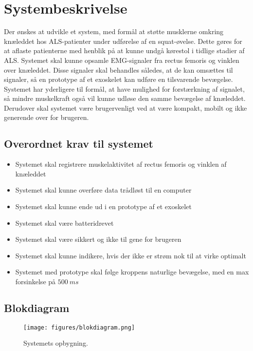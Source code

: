 \section{Systembeskrivelse}
Der ønskes at udvikle et system, med formål at støtte musklerne omkring knæleddet hos ALS-patienter under udførelse af en squat-øvelse. Dette gøres for at aflaste patienterne med henblik på at kunne undgå kørestol i tidlige stadier af ALS. 
Systemet skal kunne opsamle EMG-signaler fra rectus femoris og vinklen over knæleddet. Disse signaler skal behandles således, at de kan omsættes til signaler, så en prototype af et exoskelet kan udføre en tilsvarende bevægelse. 
Systemet har yderligere til formål, at have mulighed for forstærkning af signalet, så mindre muskelkraft også vil kunne udløse den samme bevægelse af knæleddet. 
Derudover skal systemet være brugervenligt ved at være kompakt, mobilt og ikke generende over for brugeren.

\subsection{Overordnet krav til systemet} 
\begin{itemize}
\item Systemet skal registrere muskelaktivitet af rectus femoris og vinklen af knæleddet
\item Systemet skal kunne overføre data trådløst til en computer
\item Systemet skal kunne ende ud i en prototype af et exoskelet
\item Systemet skal være batteridrevet
\item Systemet skal være sikkert og ikke til gene for brugeren 
\item Systemet skal kunne indikere, hvis der ikke er strøm nok til at virke optimalt
\item Systemet med prototype skal følge kroppens naturlige bevægelse, med en max forsinkelse på $500~ms$ 
\end{itemize}


\subsection{Blokdiagram}
\begin{figure}[H]
\centering
\texttt{[image: figures/blokdiagram.png]}
\caption{Systemets opbygning.}
\label{fig:blokdiagram}
\end{figure}

